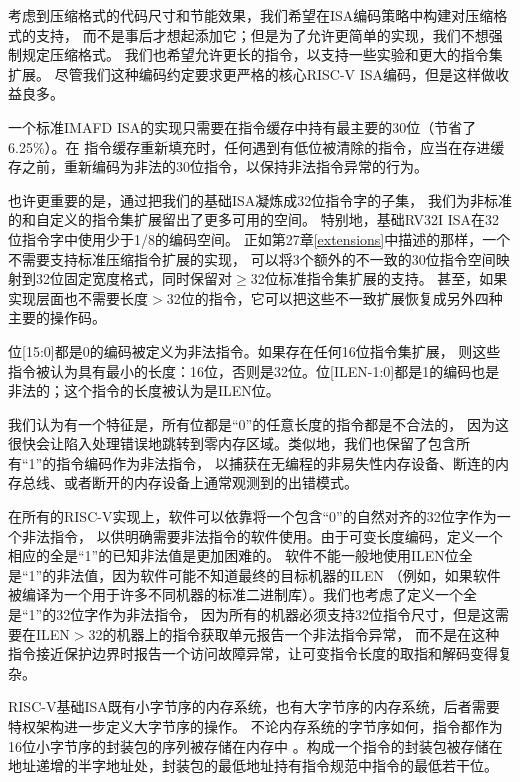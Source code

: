 \begin{commentary}

  考虑到压缩格式的代码尺寸和节能效果，我们希望在ISA编码策略中构建对压缩格式的支持，
  而不是事后才想起添加它；但是为了允许更简单的实现，我们不想强制规定压缩格式。
  我们也希望允许更长的指令，以支持一些实验和更大的指令集扩展。
  尽管我们这种编码约定要求更严格的核心RISC-V ISA编码，但是这样做收益良多。

  一个标准IMAFD ISA的实现只需要在指令缓存中持有最主要的30位（节省了6.25\%）。在
  指令缓存重新填充时，任何遇到有低位被清除的指令，应当在存进缓存之前，重新编码为非法的30位指令，以保持非法指令异常的行为。

  也许更重要的是，通过把我们的基础ISA凝炼成32位指令字的子集，
  我们为非标准的和自定义的指令集扩展留出了更多可用的空间。
  特别地，基础RV32I ISA在32位指令字中使用少于1/8的编码空间。
  正如第27章\ref{extensions}中描述的那样，一个不需要支持标准压缩指令扩展的实现，
  可以将3个额外的不一致的30位指令空间映射到32位固定宽度格式，同时保留对$\geq$32位标准指令集扩展的支持。
  甚至，如果实现层面也不需要长度$>$32位的指令，它可以把这些不一致扩展恢复成另外四种主要的操作码。
\end{commentary}

位[15:0]都是0的编码被定义为非法指令。如果存在任何16位指令集扩展，
则这些指令被认为具有最小的长度：16位，否则是32位。位[ILEN-1:0]都是1的编码也是非法的；这个指令的长度被认为是ILEN位。

\begin{commentary}

我们认为有一个特征是，所有位都是“0”的任意长度的指令都是不合法的，
因为这很快会让陷入处理错误地跳转到零内存区域。类似地，我们也保留了包含所有“1”的指令编码作为非法指令，
以捕获在无编程的非易失性内存设备、断连的内存总线、或者断开的内存设备上通常观测到的出错模式。

在所有的RISC-V实现上，软件可以依靠将一个包含“0”的自然对齐的32位字作为一个非法指令，
以供明确需要非法指令的软件使用。由于可变长度编码，定义一个相应的全是“1”的已知非法值是更加困难的。
软件不能一般地使用ILEN位全是“1”的非法值，因为软件可能不知道最终的目标机器的ILEN
（例如，如果软件被编译为一个用于许多不同机器的标准二进制库）。我们也考虑了定义一个全是“1”的32位字作为非法指令，
因为所有的机器必须支持32位指令尺寸，但是这需要在ILEN$>$32的机器上的指令获取单元报告一个非法指令异常，
而不是在这种指令接近保护边界时报告一个访问故障异常，让可变指令长度的取指和解码变得复杂。

\end{commentary}

RISC-V基础ISA既有小字节序的内存系统，也有大字节序的内存系统，后者需要特权架构进一步定义大字节序的操作。
不论内存系统的字节序如何，指令都作为16位小字节序的封装包的序列被存储在内存中
。构成一个指令的封装包被存储在地址递增的半字地址处，封装包的最低地址持有指令规范中指令的最低若干位。

